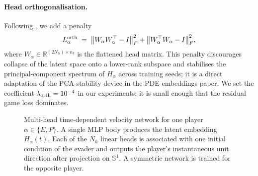 \documentclass[11pt]{article}
\newcommand{\RR}{\mathbb{R}}
\begin{document}
\paragraph{Head orthogonalisation.}  Following
\citep{JimenezEmbeddings2026}, we add a penalty
\begin{equation}
\label{eq:head-orth}
L_\alpha^{\rm orth}
\;=\;
\big\| W_\alpha W_\alpha^\top - I\big\|_F^2
+\big\| W_\alpha^\top W_\alpha - I\big\|_F^2,
\end{equation}
where $W_\alpha\in\RR^{(2N_h)\times n_b}$ is the flattened head matrix.
This penalty discourages collapse of the latent space onto a
lower-rank subspace and stabilises the principal-component spectrum of
$H_\alpha$ across training seeds; it is a direct adaptation of the
PCA-stability device in the PDE embeddings paper.  We set the
coefficient $\lambda_{\rm orth} = 10^{-4}$ in our experiments; it is
small enough that the residual game loss dominates.

\medskip

\begin{figure}[h]
\centering
{}
\caption{Multi-head time-dependent velocity network for one player
$\alpha\in\{E,P\}$.  A single MLP body produces the latent embedding
$H_\alpha(t)$.  Each of the $N_h$ linear heads is associated with one
initial condition of the evader and outputs the player's
instantaneous unit direction after projection on $\mathbb{S}^1$.
A symmetric network is trained for the opposite player.}
\label{fig:arch}
\end{figure}
\end{document}
